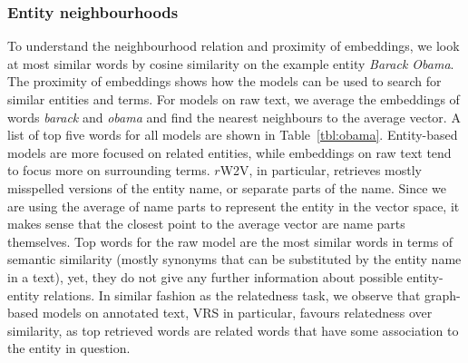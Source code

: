 \subsubsection{Entity neighbourhoods} 
To understand the neighbourhood relation and proximity of embeddings, we look at most similar words by cosine similarity on the example entity \emph{Barack Obama}. The proximity of embeddings shows how the models can be used to search for similar entities and terms. For models on raw text, we average the embeddings of words \emph{barack} and \emph{obama} and find the nearest neighbours to the average vector. A list of top five words for all models are shown in Table~\ref{tbl:obama}. Entity-based models are more focused on related entities, while embeddings on raw text tend to focus more on surrounding terms. $r$W2V, in particular, retrieves mostly misspelled versions of the entity name, or separate parts of the name. Since we are using the average of name parts to represent the entity in the vector space, it makes sense that the closest point to the average vector are name parts themselves. Top words for the raw model are the most similar words in terms of semantic similarity (mostly synonyms that can be substituted by the entity name in a text), yet, they do not give any further information about possible entity-entity relations. In similar fashion as the relatedness task, we observe that graph-based models on annotated text, VRS in particular, favours relatedness over similarity, as top retrieved words are related words that have some association to the entity in question. \\
